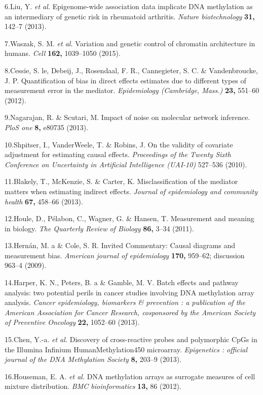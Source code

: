 \documentclass[]{article}
\begin{document}
6.Liu, Y. \emph{et al.} Epigenome-wide association data implicate DNA
methylation as an intermediary of genetic risk in rheumatoid arthritis.
\emph{Nature biotechnology} \textbf{31,} 142--7 (2013).

7.Waszak, S. M. \emph{et al.} Variation and genetic control of chromatin
architecture in humans. \emph{Cell} \textbf{162,} 1039--1050 (2015).

8.Cessie, S. le, Debeij, J., Rosendaal, F. R., Cannegieter, S. C. \&
Vandenbroucke, J. P. Quantification of bias in direct effects estimates
due to different types of measurement error in the mediator.
\emph{Epidemiology (Cambridge, Mass.)} \textbf{23,} 551--60 (2012).

9.Nagarajan, R. \& Scutari, M. Impact of noise on molecular network
inference. \emph{PloS one} \textbf{8,} e80735 (2013).

10.Shpitser, I., VanderWeele, T. \& Robins, J. On the validity of
covariate adjustment for estimating causal effects. \emph{Proceedings of
the Twenty Sixth Conference on Uncertainty in Artificial Intelligence
(UAI-10)} 527--536 (2010).

11.Blakely, T., McKenzie, S. \& Carter, K. Misclassification of the
mediator matters when estimating indirect effects. \emph{Journal of
epidemiology and community health} \textbf{67,} 458--66 (2013).

12.Houle, D., P{é}labon, C., Wagner, G. \& Hansen, T. Measurement and
meaning in biology. \emph{The Quarterly Review of Biology} \textbf{86,}
3--34 (2011).

13.Hern{á}n, M. a \& Cole, S. R. Invited Commentary: Causal diagrams and
measurement bias. \emph{American journal of epidemiology} \textbf{170,}
959--62; discussion 963--4 (2009).

14.Harper, K. N., Peters, B. a \& Gamble, M. V. Batch effects and
pathway analysis: two potential perils in cancer studies involving DNA
methylation array analysis. \emph{Cancer epidemiology, biomarkers \&
prevention : a publication of the American Association for Cancer
Research, cosponsored by the American Society of Preventive Oncology}
\textbf{22,} 1052--60 (2013).

15.Chen, Y.-a. \emph{et al.} Discovery of cross-reactive probes and
polymorphic CpGs in the Illumina Infinium HumanMethylation450
microarray. \emph{Epigenetics : official journal of the DNA Methylation
Society} \textbf{8,} 203--9 (2013).

16.Houseman, E. A. \emph{et al.} DNA methylation arrays as surrogate
measures of cell mixture distribution. \emph{BMC bioinformatics}
\textbf{13,} 86 (2012).
\end{document}
